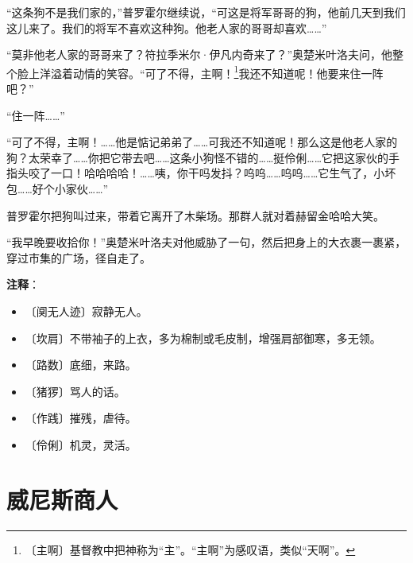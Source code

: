 \documentclass[12pt,UTF-8,openany]{ctexbook}
\begin{document}
\begin{normalsize}
    “这条狗不是我们家的，”普罗霍尔继续说，“可这是将军哥哥的狗，他前几天到我们这儿来了。我们的将军不喜欢这种狗。他老人家的哥哥却喜欢……”
    
    “莫非他老人家的哥哥来了？符拉季米尔·伊凡内奇来了？”奥楚米叶洛夫问，他整个脸上洋溢着动情的笑容。“可了不得，主啊！\footnote{〔主啊〕基督教中把神称为“主”。“主啊”为感叹语，类似“天啊”。}我还不知道呢！他要来住一阵吧？”
    
    “住一阵……”
    
    “可了不得，主啊！……他是惦记弟弟了……可我还不知道呢！那么这是他老人家的狗？太荣幸了……你把它带去吧……这条小狗怪不错的……挺伶俐……它把这家伙的手指头咬了一口！哈哈哈哈！……咦，你干吗发抖？呜呜……呜呜……它生气了，小坏包……好个小家伙……”
    
    普罗霍尔把狗叫过来，带着它离开了木柴场。那群人就对着赫留金哈哈大笑。
    
    “我早晚要收拾你！”奥楚米叶洛夫对他威胁了一句，然后把身上的大衣裹一裹紧，穿过市集的广场，径自走了。
    
\end{normalsize}


\newpage

\textbf{注释}：

\vspace{-1em}

\begin{itemize}
    \setlength\itemsep{-0.2em}
    \item 〔阒无人迹〕寂静无人。
    \item 〔坎肩〕不带袖子的上衣，多为棉制或毛皮制，增强肩部御寒，多无领。
    \item 〔路数〕底细，来路。
    \item 〔猪猡〕骂人的话。
    \item 〔作践〕摧残，虐待。
    \item 〔伶俐〕机灵，灵活。
\end{itemize}

\chapter{威尼斯商人}
\end{document}
